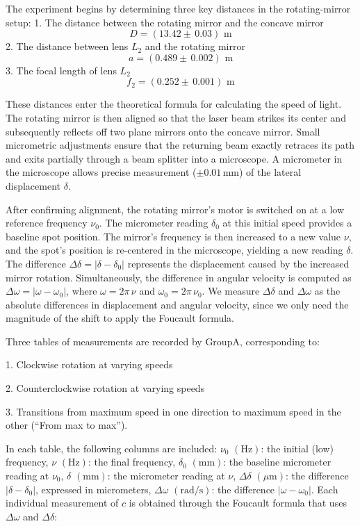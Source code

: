 
The experiment begins by determining three key distances in the rotating-mirror setup:
1. The distance between the rotating mirror and the concave mirror
\[
D = (13.42\pm\,0.03)\text{ m}
\]  
2. The distance between lens \(L_2\) and the rotating mirror
\[
a = ( 0.489 \pm\,0.002)\text{ m}
\]  
3. The focal length of lens \(L_2\)  
\[
f_{2} = ( 0.252 \pm\,0.001)\text{ m}
\]  

These distances enter the theoretical formula for calculating the speed of light. The rotating mirror is then aligned so that the laser beam strikes its center and subsequently reflects off two plane mirrors onto the concave mirror. Small micrometric adjustments ensure that the returning beam exactly retraces its path and exits partially through a beam splitter into a microscope. A micrometer in the microscope allows precise measurement (\(\pm 0.01\,\mathrm{mm}\)) of the lateral displacement \(\delta\).

After confirming alignment, the rotating mirror’s motor is switched on at a low reference frequency \(\nu_0\). The micrometer reading \(\delta_0\) at this initial speed provides a baseline spot position. The mirror’s frequency is then increased to a new value \(\nu\), and the spot’s position is re-centered in the microscope, yielding a new reading \(\delta\). The difference \(\Delta \delta = |\delta - \delta_0|\)  represents the displacement caused by the increased mirror rotation. Simultaneously, the difference in angular velocity is computed as \(\Delta \omega = |\omega - \omega_0|\), where \(\omega = 2\pi\,\nu\) and \(\omega_0 = 2\pi\,\nu_0\). We measure \(\Delta\delta\) and \(\Delta\omega\) as the absolute differences in displacement and angular velocity, since we only need the magnitude of the shift to apply the Foucault formula.

Three tables of measurements are recorded by GroupA, corresponding to:

1. Clockwise rotation at varying speeds

2. Counterclockwise rotation at varying speeds

3. Transitions from maximum speed in one direction to maximum speed in the other (“From max to max”).  

In each table, the following columns are included: \(\nu_{0}\) \((\mathrm{Hz})\): the initial (low) frequency, \(\nu\) \((\mathrm{Hz})\): the final frequency, \(\delta_{0}\) \((\mathrm{mm})\): the baseline micrometer reading at \(\nu_{0}\), \(\delta\) \((\mathrm{mm})\): the micrometer reading at \(\nu\),  \(\Delta \delta\) \((\mu\mathrm{m})\): the difference \(|\delta - \delta_{0}|\), expressed in micrometers, \(\Delta \omega\) \((\mathrm{rad/s})\): the difference \(|\omega - \omega_{0}|\).
Each individual measurement of \(c\) is obtained through the Foucault formula that uses \(\Delta \omega\) and \(\Delta \delta\):

